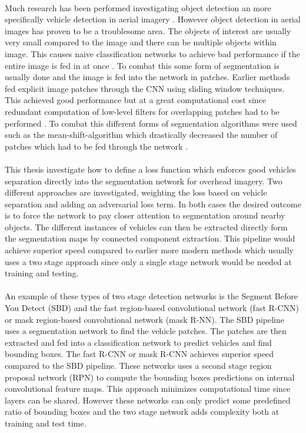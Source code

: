\documentclass{kththesis}
\begin{document}
\\
Much research has been performed investigating object detection an more specifically vehicle detection in aerial imagery \parencite{ammour_deep_2017, holt_object-based_2009, audebert_segment-before-detect:_2017, razakarivony_vehicle_2015, zhong_robust_2017, audebert_usability_2016, sakla_deep_2017}. However object detection in aerial images has proven to be a troublesome area. The objects of interest are usually very small compared to the image and there can be multiple objects within image. This causes naive classification networks to achieve bad performance if the entire image is fed in at once \parencite{ammour_deep_2017}. To combat this some form of segmentation is usually done and the image is fed into the network in patches. Earlier methods fed explicit image patches through the CNN using sliding window techniques\parencite{holt_object-based_2009}. This achieved good performance but at a great computational cost since redundant computation of low-level filters for overlapping patches had to be performed \parencite{luc_semantic_2016}. To combat this different forms of segmentation algorithms were used such as the mean-shift-algorithm which drastically decreased the number of patches which had to be fed through the network \parencite{ammour_deep_2017}. \\
\\
This thesis investigate how to define a loss function which enforces good vehicles separation directly into the segmentation network for overhead imagery. Two different approaches are investigated, weighting the loss based on vehicle separation and adding an adversarial loss term. In both cases the desired outcome is to force the network to pay closer attention to segmentation around nearby objects. The different instances of vehicles can then be extracted directly form the segmentation maps by connected component extraction. This pipeline would achieve superior speed compared to earlier more modern methods which usually uses a two stage approach since only a single stage network would be needed at training and testing.\\
\\
An example of these types of two stage detection networks is the Segment Before You Detect (SBD)\parencite{audebert_segment-before-detect:_2017} and the fast region-based convolutional network (fast R-CNN) \parencite{ren_faster_2015, girshick_fast_2015} or mask region-based convolutional network (mask R-NN). The SBD pipeline uses a segmentation network to find the vehicle patches. The patches are then extracted and fed into a classification network to predict vehicles and find bounding boxes. The fast R-CNN or mask R-CNN \parencite{he_mask_2017} achieves superior speed compared to the SBD pipeline. These networks uses a second stage region proposal network (RPN) to compute the bounding boxes predictions on internal convolutional feature maps. This approach minimizes computational time since layers can be shared. However these networks can only predict some predefined ratio of bounding boxes and the two stage network adds complexity both at training and test time.
\end{document}

